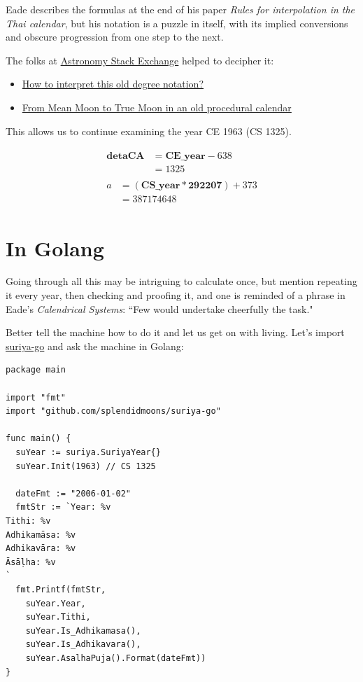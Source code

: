 \documentclass[11pt,oneside]{memoir-article}
\begin{document}
Eade describes the formulas at the end of his paper \emph{Rules for interpolation in
the Thai calendar}\cite{eade2000rules}, but his notation is a puzzle in itself,
with its implied conversions and obscure progression from one step to the next.

The folks at \href{http://astronomy.stackexchange.com/}{Astronomy Stack Exchange} helped to decipher it:

\begin{itemize}
\item \href{http://astronomy.stackexchange.com/questions/11753/how-to-interpret-this-old-degree-notation}{How to interpret this old degree notation?}
\item \href{http://astronomy.stackexchange.com/questions/12052/from-mean-moon-to-true-moon-in-an-old-procedural-calendar}{From Mean Moon to True Moon in an old procedural calendar}
\end{itemize}

This allows us to continue examining the year CE 1963 (CS 1325).


\begin{align}
\begin{split}
   \mathbf{detaCA} &= \mathbf{CE\_year} - 638\\
                     &= 1325
\end{split}\\
\begin{split}
                   a &= (\mathbf{CS\_year} * \mathbf{292207}) + 373\\
                     &= 387174648
\end{split}
\end{align}

\section{In Golang}
\label{sec-5-6}
\label{suriya-go-example}

Going through all this may be intriguing to calculate once, but mention
repeating it every year, then checking and proofing it, and one is reminded of a
phrase in Eade's \emph{Calendrical Systems}: ``Few would undertake cheerfully the
task."\cite{eade1995calendrical}

Better tell the machine how to do it and let us get on with living. Let's
import \href{https://github.com/splendidmoons/suriya-go}{suriya-go} and ask the machine in Golang:

\begin{verbatim}
package main

import "fmt"
import "github.com/splendidmoons/suriya-go"

func main() {
  suYear := suriya.SuriyaYear{}
  suYear.Init(1963) // CS 1325

  dateFmt := "2006-01-02"
  fmtStr := `Year: %v
Tithi: %v
Adhikamāsa: %v
Adhikavāra: %v
Āsāḷha: %v
`
  fmt.Printf(fmtStr,
    suYear.Year,
    suYear.Tithi,
    suYear.Is_Adhikamasa(),
    suYear.Is_Adhikavara(),
    suYear.AsalhaPuja().Format(dateFmt))
}
\end{verbatim}
\end{document}
